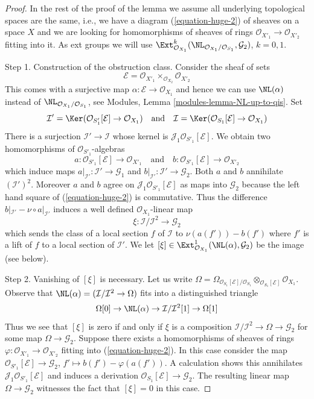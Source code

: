 \begin{proof}
\medskip\noindent
In the rest of the proof of the lemma we assume
all underlying topological spaces are the
same, i.e., we have a diagram (\ref{equation-huge-2}) of sheaves on
a space $X$ and we are looking for homomorphisms of sheaves of rings
$\mathcal{O}_{X'_1} \to \mathcal{O}_{X'_2}$ fitting into it.
As ext groups we will use
$\Ext^k_{\mathcal{O}_{X_1}}(
\NL_{\mathcal{O}_{X_1}/\mathcal{O}_{S_1}}, \mathcal{G}_2)$, $k = 0, 1$.

\medskip\noindent
Step 1. Construction of the obstruction class. Consider the sheaf
of sets
$$
\mathcal{E} = \mathcal{O}_{X'_1} \times_{\mathcal{O}_{X_2}} \mathcal{O}_{X'_2}
$$
This comes with a surjective map $\alpha : \mathcal{E} \to \mathcal{O}_{X_1}$
and hence we can use $\NL(\alpha)$ instead of
$\NL_{\mathcal{O}_{X_1}/\mathcal{O}_{S_1}}$, see
Modules, Lemma \ref{modules-lemma-NL-up-to-qis}.
Set
$$
\mathcal{I}' =
\Ker(\mathcal{O}_{S'_1}[\mathcal{E}] \to \mathcal{O}_{X_1})
\quad\text{and}\quad
\mathcal{I} =
\Ker(\mathcal{O}_{S_1}[\mathcal{E}] \to \mathcal{O}_{X_1})
$$
There is a surjection $\mathcal{I}' \to \mathcal{I}$ whose kernel
is $\mathcal{J}_1\mathcal{O}_{S'_1}[\mathcal{E}]$.
We obtain two homomorphisms of $\mathcal{O}_{S'_1}$-algebras
$$
a : \mathcal{O}_{S'_1}[\mathcal{E}] \to \mathcal{O}_{X'_1}
\quad\text{and}\quad
b : \mathcal{O}_{S'_1}[\mathcal{E}] \to \mathcal{O}_{X'_2}
$$
which induce maps $a|_{\mathcal{I}'} : \mathcal{I}' \to \mathcal{G}_1$ and
$b|_{\mathcal{I}'} : \mathcal{I}' \to \mathcal{G}_2$. Both $a$ and $b$
annihilate $(\mathcal{I}')^2$. Moreover $a$ and $b$ agree on
$\mathcal{J}_1\mathcal{O}_{S'_1}[\mathcal{E}]$ as maps into $\mathcal{G}_2$
because the left hand square of (\ref{equation-huge-2}) is commutative.
Thus the difference
$b|_{\mathcal{I}'} - \nu \circ a|_{\mathcal{I}'}$
induces a well defined $\mathcal{O}_{X_1}$-linear map
$$
\xi : \mathcal{I}/\mathcal{I}^2 \longrightarrow \mathcal{G}_2
$$
which sends the class of a local section $f$ of $\mathcal{I}$ to
$\nu(a(f')) - b(f')$ where $f'$ is a lift of $f$ to a local
section of $\mathcal{I}'$. We let
$[\xi] \in \Ext^1_{\mathcal{O}_{X_1}}(\NL(\alpha), \mathcal{G}_2)$
be the image (see below).

\medskip\noindent
Step 2. Vanishing of $[\xi]$ is necessary. Let us write
$\Omega = \Omega_{\mathcal{O}_{S_1}[\mathcal{E}]/\mathcal{O}_{S_1}}
\otimes_{\mathcal{O}_{S_1}[\mathcal{E}]} \mathcal{O}_{X_1}$.
Observe that $\NL(\alpha) = (\mathcal{I}/\mathcal{I}^2 \to \Omega)$
fits into a distinguished triangle
$$
\Omega[0] \to
\NL(\alpha) \to
\mathcal{I}/\mathcal{I}^2[1] \to
\Omega[1]
$$
Thus we see that $[\xi]$ is zero if and only if $\xi$
is a composition $\mathcal{I}/\mathcal{I}^2 \to \Omega \to \mathcal{G}_2$
for some map $\Omega \to \mathcal{G}_2$. Suppose there exists a
homomorphisms of sheaves of rings
$\varphi : \mathcal{O}_{X'_1} \to \mathcal{O}_{X'_2}$ fitting into
(\ref{equation-huge-2}). In this case consider the map
$\mathcal{O}_{S'_1}[\mathcal{E}] \to \mathcal{G}_2$,
$f' \mapsto b(f') - \varphi(a(f'))$. A calculation
shows this annihilates $\mathcal{J}_1\mathcal{O}_{S'_1}[\mathcal{E}]$
and induces a derivation $\mathcal{O}_{S_1}[\mathcal{E}] \to \mathcal{G}_2$.
The resulting linear map $\Omega \to \mathcal{G}_2$ witnesses the
fact that $[\xi] = 0$ in this case.


\end{proof}
